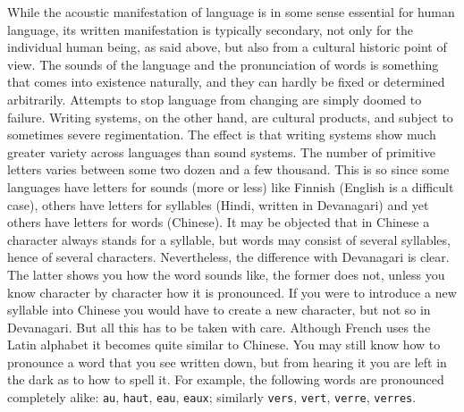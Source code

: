 While the acoustic manifestation of language is in some sense
essential for human language, its written manifestation is
typically secondary, not only for the individual human being, as
said above, but also from a cultural historic point of view. The
sounds of the language and the pronunciation of words is something
that comes into existence naturally, and they can hardly be fixed
or determined arbitrarily. Attempts to stop language from changing
are simply doomed to failure. Writing systems, on the other hand,
are cultural products, and subject to sometimes severe regimentation. 
The effect is that writing systems show much greater variety across 
languages than sound systems. The number of primitive letters varies 
between some two dozen and a few thousand. This is so since some 
languages have letters for sounds (more or less) like Finnish 
(English is a difficult case), others have letters for syllables 
(Hindi, written in Devanagari) and yet others have letters for 
words (Chinese). 
It may be objected that in Chinese a character always stands for a 
syllable, but words may consist of several syllables, hence 
of several characters. Nevertheless, the difference with 
Devanagari is clear. The latter shows you how the word sounds like, 
the former does not, unless you know character by character how it 
is pronounced. If you were to introduce a new syllable into Chinese 
you would have to create a new character, but not so in Devanagari. But 
all this has to be taken with care. Although French 
uses the Latin 
alphabet it becomes quite similar to Chinese. You may still know how 
to pronounce a word that you see written down, but from hearing it 
you are left in the dark as to how to spell it. For example, the 
following words are pronounced completely alike: {\tt au}, {\tt haut}, 
{\tt eau}, {\tt eaux}; similarly {\tt vers}, {\tt vert}, {\tt verre}, 
{\tt verres}.

